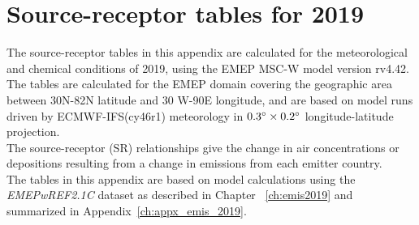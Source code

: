 \setcounter{page}{1}

\cleardoublepage
\chapter[SR tables for 2019]{Source-receptor tables for 2019}
\label{ch:appx_sr2019}



The source-receptor tables in this appendix are calculated for the
meteorological and chemical conditions of 2019, using the EMEP MSC-W model version rv4.42. The tables are calculated for the EMEP domain covering the geographic area between 30\degrees N-82\degrees N latitude and 30\degrees 
W-90\degrees E longitude, and are based on model runs driven by ECMWF-IFS(cy46r1) meteorology in $0.3^{\circ} \times 0.2^{\circ}$ longitude-latitude projection.\\

The source-receptor (SR) relationships give the change in air concentrations or depositions resulting from a
change in emissions from each emitter country.\\ 

The tables in this appendix are based on model calculations using the \textit{EMEPwREF2.1C} dataset as described in Chapter ~\ref{ch:emis2019} and summarized in Appendix~\ref{ch:appx_emis_2019}.\\

